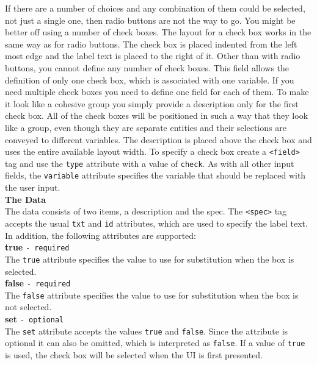 If there are a number of choices and any combination of them could be
selected, not just a single one, then radio buttons are not the way to
go. You might be better off using a number of check boxes. The layout
for a check box works in the same way as for radio buttons. The check
box is placed indented from the left most edge and the label text is
placed to the right of it. Other than with radio buttons, you cannot
define any number of check boxes. This field allows the definition of
only one check box, which is associated with one variable. If you need
multiple check boxes you need to define one field for each of them.  To
make it look like a cohesive group you simply provide a description only
for the first check box. All of the check boxes will be positioned in
such a way that they look like a group, even though they are separate
entities and their selections are conveyed to different variables. The
description  is placed above the check box and uses the entire available
layout width. To specify a check box create a \texttt{<field>} tag and
use the \texttt{type} attribute with a value of \texttt{check}. As with
all other input fields, the \texttt{variable} attribute specifies the
variable that should be replaced with the user input.\\

\textbf{The Data}\\

The data consists of two items, a description and the spec. The
\texttt{<spec>} tag accepts the usual \texttt{txt} and \texttt{id}
attributes, which are used to specify the label text. In addition, the
following attributes are supported:\\

\textbf{true} \texttt{- required}\\

The \texttt{true} attribute specifies the value to use for substitution
when the box is selected.\\

\textbf{false} \texttt{- required}\\

The \texttt{false} attribute specifies the value to use for substitution
when the box is not selected.\\

\textbf{set} \texttt{- optional}\\

The \texttt{set} attribute accepts the values \texttt{true} and
\texttt{false}. Since the attribute is optional it can also be omitted,
which is interpreted as \texttt{false}. If a value of \texttt{true} is
used, the check box will be selected when the UI is first presented.\\

